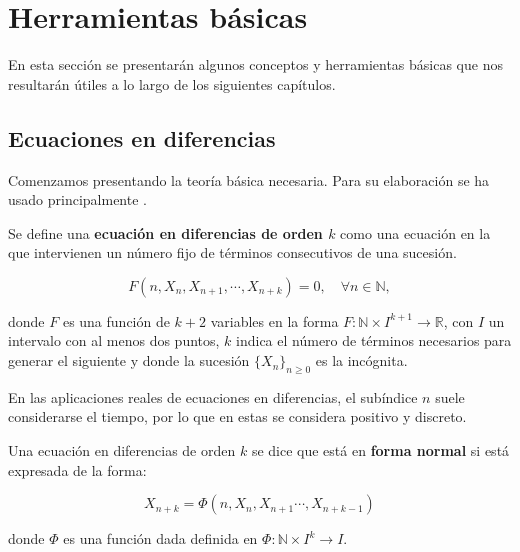 
\chapter{Herramientas básicas}

En esta sección se presentarán algunos conceptos y herramientas básicas que nos resultarán útiles a lo largo de los siguientes capítulos.

\section{Ecuaciones en diferencias}

Comenzamos presentando la teoría básica necesaria. Para su elaboración se ha usado principalmente \cite{salinelliDiscreteDynamicalModels2014}.

\begin{definition}
Se define una \textbf{ecuación en diferencias de orden $k$} como una ecuación en la que intervienen un número fijo de términos consecutivos de una sucesión.

\begin{equation}
\label{def_ec_diferencias}
F(n,X_n, X_{n+1}, \cdots , X_{n+k}) = 0, \quad \forall n\in\mathbb{N},
\end{equation}


donde $F$ es una función de $k+2$ variables en la forma $F:\mathbb{N}\times I^{k+1}\rightarrow \mathbb{R}$, con $I$ un intervalo con al menos dos puntos, $k$ indica el número de términos necesarios para generar el siguiente y donde la sucesión $\{X_n\}_{n\geq 0}$ es la incógnita.
\end{definition}

En las aplicaciones reales de ecuaciones en diferencias, el subíndice $n$ suele considerarse el tiempo, por lo que en estas se considera positivo y discreto.

\begin{definition}
Una ecuación en diferencias de orden $k$ se dice que está en \textbf{forma normal} si está expresada de la forma:

\begin{equation}
\label{def_ec_forma_normal}
X_{n+k} = \Phi (n, X_n, X_{n+1}\cdots , X_{n+k-1})
\end{equation}


donde $\Phi$ es una función dada definida en $\Phi :\mathbb{N}\times I^{k}\rightarrow I$.
\end{definition}

